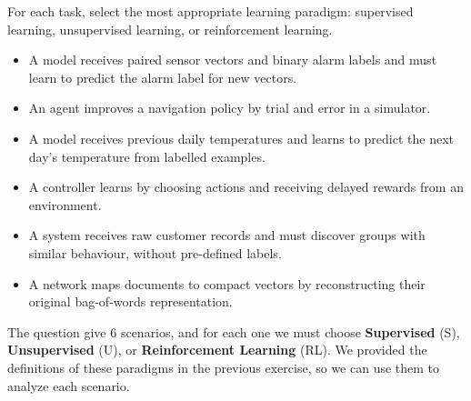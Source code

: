 \noindent
\exercise[1.5] For each task, select the most appropriate learning paradigm: supervised learning, unsupervised learning, or reinforcement learning.
\begin{itemize}
    \item A model receives paired sensor vectors and binary alarm labels and must learn to predict the alarm label for new vectors.
    \item An agent improves a navigation policy by trial and error in a simulator.
    \item A model receives previous daily temperatures and learns to predict the next day's temperature from labelled examples.
    \item A controller learns by choosing actions and receiving delayed rewards from an environment.
    \item A system receives raw customer records and must discover groups with similar behaviour, without pre-defined labels.
    \item A network maps documents to compact vectors by reconstructing their original bag-of-words representation.
\end{itemize}
\solution The question give 6 scenarios, and for each one we must choose \textbf{Supervised} (S), \textbf{Unsupervised} (U), or \textbf{Reinforcement Learning} (RL). We provided the definitions of these paradigms in the previous exercise, so we can use them to analyze each scenario.
